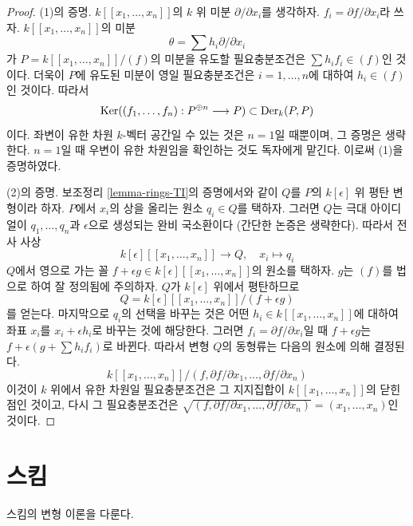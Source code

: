 \begin{proof}
(1)의 증명. $k[[x_1, \ldots, x_n]]$의 $k$ 위 미분
$\partial/\partial x_i$를 생각하자. $f_i = \partial f/\partial x_i$라 쓰자.
$k[[x_1, \ldots, x_n]]$의 미분
$$
\theta = \sum h_i \partial/\partial x_i
$$
가 $P = k[[x_1, \ldots, x_n]]/(f)$의 미분을 유도할 필요충분조건은
$\sum h_i f_i \in (f)$인 것이다. 더욱이 $P$에 유도된 미분이 영일
필요충분조건은 $i = 1, \ldots, n$에 대하여 $h_i \in (f)$인 것이다.
따라서
$$
\mathop{\mathrm{Ker}}((f_1, \ldots, f_n) : P^{\oplus n} \longrightarrow P) \subset
\text{Der}_k(P, P)
$$
이다. 좌변이 유한 차원 $k$-벡터 공간일 수 있는 것은 $n = 1$일 때뿐이며,
그 증명은 생략한다. $n = 1$일 때 우변이 유한 차원임을 확인하는 것도
독자에게 맡긴다. 이로써 (1)을 증명하였다.

\medskip\noindent
(2)의 증명. 보조정리 \ref{lemma-rings-TI}의 증명에서와 같이 $Q$를
$P$의 $k[\epsilon]$ 위 평탄 변형이라 하자. $P$에서 $x_i$의 상을
올리는 원소 $q_i \in Q$를 택하자. 그러면 $Q$는 극대 아이디얼이
$q_1, \ldots, q_n$과 $\epsilon$으로 생성되는 완비 국소환이다
(간단한 논증은 생략한다). 따라서 전사 사상
$$
k[\epsilon][[x_1, \ldots, x_n]] \longrightarrow Q,\quad
x_i \longmapsto q_i
$$
$Q$에서 영으로 가는 꼴
$f + \epsilon g \in k[\epsilon][[x_1, \ldots, x_n]]$의 원소를 택하자.
$g$는 $(f)$를 법으로 하여 잘 정의됨에 주의하자. $Q$가
$k[\epsilon]$ 위에서 평탄하므로
$$
Q = k[\epsilon][[x_1, \ldots, x_n]]/(f + \epsilon g)
$$
를 얻는다. 마지막으로 $q_i$의 선택을 바꾸는 것은 어떤
$h_i \in k[[x_1, \ldots, x_n]]$에 대하여 좌표 $x_i$를
$x_i + \epsilon h_i$로 바꾸는 것에 해당한다.%
그러면 $f_i = \partial f/\partial x_i$일 때 $f + \epsilon g$는
$f + \epsilon (g + \sum h_i f_i)$로 바뀐다. 따라서 변형 $Q$의 동형류는
다음의 원소에 의해 결정된다.
$$
k[[x_1, \ldots, x_n]]/
(f, \partial f/\partial x_1, \ldots,  \partial f/\partial x_n)
$$
이것이 $k$ 위에서 유한 차원일 필요충분조건은 그 지지집합이
$k[[x_1, \ldots, x_n]]$의 닫힌점인 것이고, 다시 그 필요충분조건은
$\sqrt{(f, \partial f/\partial x_1, \ldots,  \partial f/\partial x_n)} =
(x_1, \ldots, x_n)$인 것이다.
\end{proof}






\section{스킴}
\label{section-schemes}

\noindent
스킴의 변형 이론을 다룬다.

